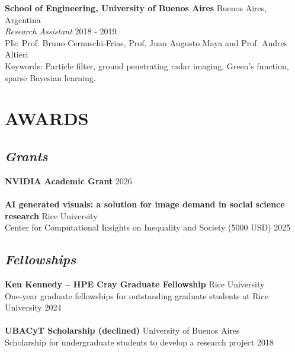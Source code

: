 \documentclass[a4paper,9pt]{extarticle}
\begin{document}
\noindent
\textbf{School of Engineering, University of Buenos Aires} \hfill Buenos Aires, Argentina\\ %
\textit{Research Assistant} \hfill 2018 - 2019\\ %
PIs: Prof. Bruno Cernuschi-Frias, Prof. Juan Augusto Maya and Prof. Andres Altieri\\
Keywords: Particle filter, ground penetrating radar imaging, Green's function, sparse Bayesian learning.\\


\section*{AWARDS}


\subsection*{\textit{Grants}}
\textbf{NVIDIA Academic Grant}  \hfill 2026\\ \\
\textbf{AI generated visuals: a solution for image demand in social science research}  \hfill Rice University\\
Center for Computational Insights on Inequality and Society (5000 USD) \hfill 2025

\subsection*{\textit{Fellowships}}
\textbf{Ken Kennedy – HPE Cray Graduate Fellowship}  \hfill Rice University\\
One-year graduate fellowships for outstanding graduate students at Rice University \hfill 2024\\ \\
\textbf{UBACyT Scholarship (declined)}  \hfill University of Buenos Aires\\ 
Scholarship for undergraduate students to develop a research project \hfill 2018
\end{document}
